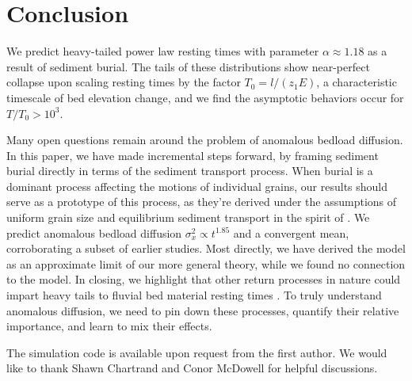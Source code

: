 \documentclass[draft]{agujournal2018}
\begin{document}
\section{Conclusion}


We predict heavy-tailed power law resting times with parameter $\alpha \approx 1.18$ as a result of sediment burial.
The tails of these distributions show near-perfect collapse upon scaling resting times by the factor $T_0 = l/(z_1 E)$, a characteristic timescale of bed elevation change, and we find the asymptotic behaviors occur for $T/T_0>10^3$.


Many open questions remain around the problem of anomalous bedload diffusion.
In this paper, we have made incremental steps forward, by framing sediment burial directly in terms of the sediment transport process.
When burial is a dominant process affecting the motions of individual grains, our results should serve as a prototype of this process, as they're derived under the assumptions of uniform grain size and equilibrium sediment transport in the spirit of \citet{Einstein1950}.
We predict anomalous bedload diffusion $\sigma_x^2 \propto t^{1.85}$ and a convergent mean, corroborating a subset of earlier studies.
Most directly, we have derived the \citet{Martin2014} model as an approximate limit of our more general theory, while we found no connection to the \citet{Voepel2013} model.
In closing, we highlight that other return processes in nature could impart heavy tails to fluvial bed material resting times \citep[e.g.][]{Bradley2017}.
To truly understand anomalous diffusion, we need to pin down these processes, quantify their relative importance, and learn to mix their effects.



\acknowledgments
The simulation code is available upon request from the first author. We would like to thank Shawn Chartrand and Conor McDowell for helpful discussions. 


\end{document}
